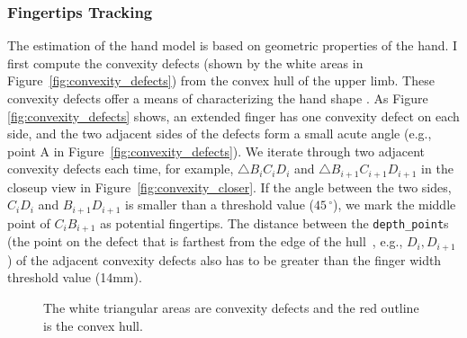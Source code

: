 \subsubsection{Fingertips Tracking}
The estimation of the hand model is based on geometric
properties of the hand. I first compute the convexity defects (shown by
the white areas in Figure~\ref{fig:convexity_defects})
from the convex hull of the upper limb.
These convexity defects offer a means of characterizing the hand shape
\cite{Opencv}. As Figure \ref{fig:convexity_defects} shows, an extended finger 
has one convexity defect on each side, and the two adjacent sides of the defects
form a small acute angle (e.g., point A in Figure~\ref{fig:convexity_defects}).
We iterate through two adjacent convexity defects each time, for example, 
$\bigtriangleup B_iC_iD_i$ and $\bigtriangleup B_{i+1}C_{i+1}D_{i+1}$ in
the closeup view in Figure~\ref{fig:convexity_closer}. If the angle between the
two sides, $C_iD_i$ and $B_{i+1}D_{i+1}$ is smaller than a threshold value ($45\,^{\circ}$), we mark
the middle point of $C_iB_{i+1}$ as potential fingertips. The distance between
the \texttt{depth\_point}s (the point on the defect that is farthest from the
edge of the hull~\cite{Opencv}, e.g., $D_i, D_{i+1}$) of the adjacent convexity
defects also has to be greater than the finger width threshold value (14mm).

\begin{figure}[tbh]
  \centering
  \caption{The white triangular areas are convexity defects and the red
  outline is the convex hull.}
\end{figure}

